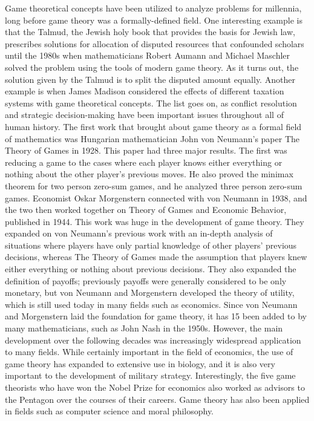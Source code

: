 Game theoretical concepts have been utilized to analyze problems for millennia, long
before game theory was a formally-defined field. One interesting example is that the Talmud, the Jewish holy book that provides the basis for Jewish law, prescribes solutions
for allocation of disputed resources that confounded scholars until the 1980s when mathematicians Robert Aumann and Michael Maschler solved the problem using the tools of
modern game theory. As it turns out, the solution given by the Talmud is to split the
disputed amount equally. Another example is when James Madison considered the effects of different taxation systems with game theoretical concepts. The list goes on, as
conflict resolution and strategic decision-making have been important issues throughout
all of human history.
The first work that brought about game theory as a formal field of mathematics
was Hungarian mathematician John von Neumann’s paper The Theory of Games in 1928. This paper had three major results. The first was reducing a game to the cases where
each player knows either everything or nothing about the other player’s previous moves.
He also proved the minimax theorem for two person zero-sum games, and he analyzed
three person zero-sum games.
Economist Oskar Morgenstern connected with von Neumann in 1938, and the
two then worked together on Theory of Games and Economic Behavior, published in
1944. This work was huge in the development of game theory. They expanded on von
Neumann’s previous work with an in-depth analysis of situations where players have only
partial knowledge of other players’ previous decisions, whereas The Theory of Games made
the assumption that players knew either everything or nothing about previous decisions.
They also expanded the definition of payoffs; previously payoffs were generally considered
to be only monetary, but von Neumann and Morgenstern developed the theory of utility,
which is still used today in many fields such as economics.
Since von Neumann and Morgenstern laid the foundation for game theory, it has
15
been added to by many mathematicians, such as John Nash in the 1950s. However, the
main development over the following decades was increasingly widespread application to
many fields. While certainly important in the field of economics, the use of game theory
has expanded to extensive use in biology, and it is also very important to the development
of military strategy. Interestingly, the five game theorists who have won the Nobel Prize
for economics also worked as advisors to the Pentagon over the courses of their careers. Game theory has also been applied in fields such as computer science and moral
philosophy.